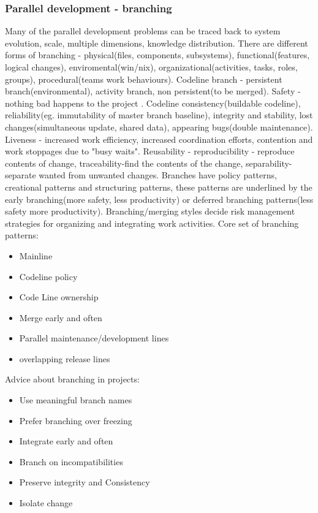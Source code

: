 \subsubsection{Parallel development - branching}
Many of the parallel development problems can be traced back to system evolution, scale, multiple dimensions, knowledge distribution.
There are different forms of branching - physical(files, components, subsystems), functional(features, logical changes), enviromental(win/nix), organizational(activities, tasks, roles, groups), procedural(teams work behaviours).
Codeline branch - persistent branch(environmental), activity branch, non persistent(to be merged).
Safety - nothing bad happens to the project . Codeline consistency(buildable codeline), reliability(eg. immutability of master branch baseline),
integrity and stability, lost changes(simultaneous update, shared data), appearing bugs(double maintenance).
Liveness - increased work efficiency, increased coordination efforts, contention and work stoppages due to "busy waits".
Reusability - reproducibility - reproduce contents of change, traceability-find the contents of the change, separability-separate wanted from unwanted changes.
Branches have policy patterns, creational patterns and structuring patterns, these patterns are underlined by the early branching(more safety, less productivity) or deferred branching patterns(less safety more productivity).
Branching/merging styles decide risk management strategies for organizing and integrating work activities.
Core set of branching patterns:
\begin{itemize}
    \item Mainline
    \item Codeline policy
    \item Code Line ownership
    \item Merge early and often
    \item Parallel maintenance/development lines
    \item overlapping release lines
\end{itemize}

Advice about branching in projects:
\begin{itemize}
    \item Use meaningful branch names
    \item Prefer branching over freezing
    \item Integrate early and often
    \item Branch on incompatibilities
    \item Preserve integrity and Consistency
    \item Isolate change
\end{itemize}

